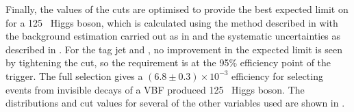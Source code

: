 Finally, the values of the cuts are optimised to provide the best expected limit on \BRinv for a 125 \GeV\, Higgs boson, which is calculated using the method described in  with the background estimation carried out as in  and the systematic uncertainties as described in . For the tag jet \pt and \MET, no improvement in the expected limit is seen by tightening the cut, so the requirement is at the 95\% efficiency point of the trigger. The full selection gives a $(6.8\pm 0.3)\times 10^{-3}$ efficiency for selecting events from invisible decays of a VBF produced 125 \GeV\, Higgs boson. The distributions and cut values for several of the other variables used are shown in . 

